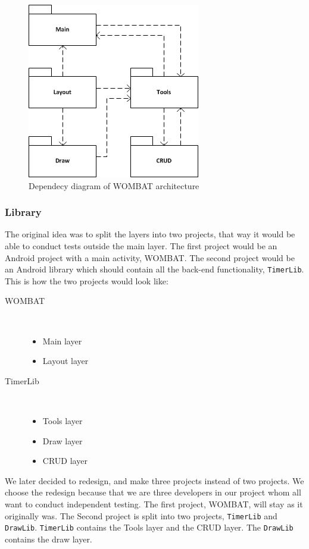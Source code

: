 \begin{figure}[H]
	\centering
		\includegraphics[scale=0.6]{Images/Implementation/WombatDependency.png}
	\caption{Dependecy diagram of WOMBAT architecture}
	\label{fig:WombatDependency}
\end{figure}

\subsubsection{Library}

The original idea was to split the layers into two projects, that way it would be able to conduct tests outside the main layer. The first project would be an Android project with a main activity, WOMBAT. The second project would be an Android library which should contain all the back-end functionality, \texttt{TimerLib}. This is how the two projects would look like:

\begin{description}
  \item[WOMBAT] \hfill \\\begin{itemize}  \item Main layer  \item Layout layer
\end{itemize}
  \item[TimerLib] \hfill \\\begin{itemize}  \item Tools layer  \item Draw layer  \item CRUD layer
\end{itemize}
\end{description}

We later decided to redesign, and make three projects instead of two projects. We choose the redesign because that we are three developers in our project whom all want to conduct independent testing. The first project, WOMBAT, will stay as it originally was. The Second project is split into two projects, \texttt{TimerLib} and \texttt{DrawLib}. \texttt{TimerLib} contains the Tools layer and the CRUD layer. The \texttt{DrawLib} contains the draw layer.

